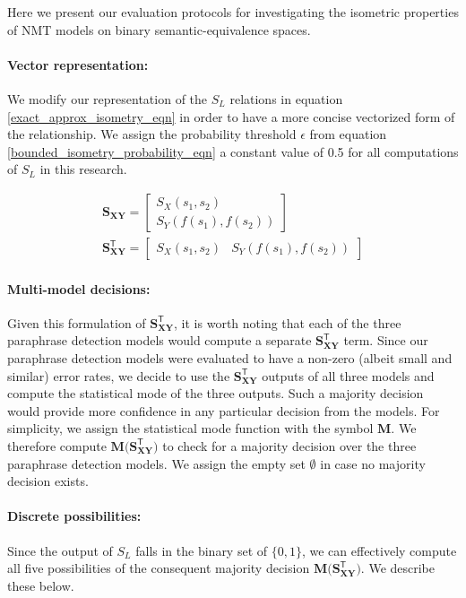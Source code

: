 \documentclass[11pt,a4paper]{article}
\begin{document}
Here we present our evaluation protocols for investigating the isometric properties of NMT models on binary semantic-equivalence spaces.

\paragraph{Vector representation:} We modify our representation of the $S_L$ relations in equation \ref{exact_approx_isometry_eqn} in order to have a more concise vectorized form of the relationship. We assign the probability threshold $\epsilon$ from equation \ref{bounded_isometry_probability_eqn} a constant value of 0.5 for all computations of $S_L$ in this research.

\vspace{-5pt}
\begin{gather}
  \mathbf{S_{XY}} = \begin{bmatrix} S_X(s_1, s_2) \\[5pt] S_Y(f(s_1), f(s_2)) \end{bmatrix} \\[10pt] 
  \mathbf{S_{XY}^{\mathsf{T}}} = \begin{bmatrix} S_X(s_1, s_2) & S_Y(f(s_1), f(s_2)) \end{bmatrix}
\end{gather}

\paragraph{Multi-model decisions:} Given this formulation of $\mathbf{S_{XY}^{\mathsf{T}}}$, it is worth noting that each of the three paraphrase detection models would compute a separate $\mathbf{S_{XY}^{\mathsf{T}}}$ term. Since our paraphrase detection models were evaluated to have a non-zero (albeit small and similar) error rates, we decide to use the $\mathbf{S_{XY}^{\mathsf{T}}}$ outputs of all three models and compute the statistical mode of the three outputs. Such a majority decision would provide more confidence in any particular decision from the models. For simplicity, we assign the statistical mode function with the symbol $\mathbf{M}$. We therefore compute $\mathbf{M(S_{XY}^{\mathsf{T}}})$ to check for a majority decision over the three paraphrase detection models. We assign the empty set $\emptyset$ in case no majority decision exists.

\paragraph{Discrete possibilities:} Since the output of $S_L$ falls in the binary set of $\{0,1\}$, we can effectively compute all five possibilities of the consequent majority decision $\mathbf{M(S_{XY}^{\mathsf{T}}})$. We describe these below.
\end{document}
